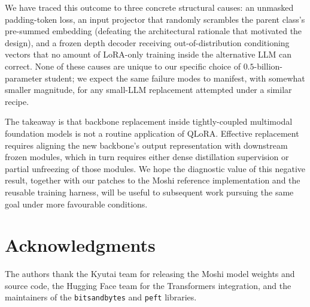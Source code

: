 \documentclass[conference]{IEEEtran}
\begin{document}
We have traced this outcome to three concrete structural causes: an unmasked padding-token loss, an input projector that randomly scrambles the parent class's pre-summed embedding (defeating the architectural rationale that motivated the design), and a frozen depth decoder receiving out-of-distribution conditioning vectors that no amount of LoRA-only training inside the alternative LLM can correct. None of these causes are unique to our specific choice of $0.5$-billion-parameter student; we expect the same failure modes to manifest, with somewhat smaller magnitude, for any small-LLM replacement attempted under a similar recipe.

The takeaway is that backbone replacement inside tightly-coupled multimodal foundation models is not a routine application of QLoRA. Effective replacement requires aligning the new backbone's output representation with downstream frozen modules, which in turn requires either dense distillation supervision or partial unfreezing of those modules. We hope the diagnostic value of this negative result, together with our patches to the Moshi reference implementation and the reusable training harness, will be useful to subsequent work pursuing the same goal under more favourable conditions.

\section*{Acknowledgments}

The authors thank the Kyutai team for releasing the Moshi model weights and source code, the Hugging Face team for the Transformers integration, and the maintainers of the \texttt{bitsandbytes} and \texttt{peft} libraries.
\end{document}
